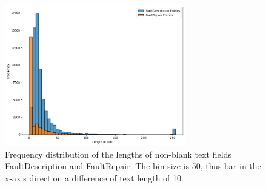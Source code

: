 \documentclass[10pt,oneside]{report}
\begin{document}
\begin{figure}[htbp]
    \centering
    \includegraphics[width=0.7\textwidth]{FaultDescriptionVSFaultRepairs.png}
    \caption{Frequency distribution of the lengths of non-blank text fields FaultDescription and FaultRepair. The bin size is 50, thus bar in the x-axis direction a difference of text length of 10.}\label{fig:FaultDescriptionVSFaultRepairs}
\end{figure}
\end{document}
